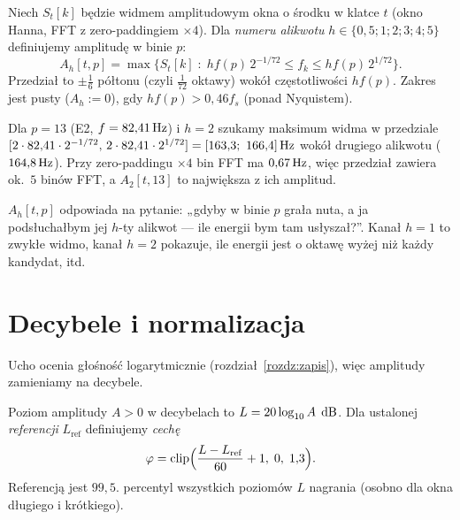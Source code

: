 \begin{definicja}\label{def:hcqt}
Niech $S_t[k]$ będzie widmem amplitudowym okna o środku w klatce $t$ (okno Hanna, FFT z zero-paddingiem $\times4$).
Dla \emph{numeru alikwotu} $h\in\{0{,}5;1;2;3;4;5\}$ definiujemy amplitudę w binie $p$:
\begin{equation}
  A_h[t,p]=\max\Big\{S_t[k]\;:\;h f(p)\,2^{-1/72}\le f_k\le h f(p)\,2^{1/72}\Big\}.
\end{equation}
Przedział to $\pm\frac1{6}$ półtonu (czyli $\frac{1}{72}$ oktawy) wokół częstotliwości $hf(p)$. Zakres jest pusty ($A_h:=0$), gdy $hf(p)>0{,}46f_s$ (ponad Nyquistem).
\end{definicja}

\begin{przyklad}\label{prz:hcqt-przedzial}
Dla $p=13$ (E2, $f=82{,}41\,\mathrm{Hz}$) i $h=2$ szukamy maksimum widma w przedziale $[2\cdot82{,}41\cdot2^{-1/72},\,2\cdot82{,}41\cdot2^{1/72}]=[163{,}3;\ 166{,}4]\Hz$ wokół drugiego alikwotu ($164{,}8\,\mathrm{Hz}$).
Przy zero-paddingu $\times4$ bin FFT ma $0{,}67\,\mathrm{Hz}$, więc przedział zawiera ok.\ $5$ binów FFT, a $A_2[t,13]$ to największa z ich amplitud.
\end{przyklad}

\begin{intuicja}
$A_h[t,p]$ odpowiada na pytanie: „gdyby w binie $p$ grała nuta, a ja podsłuchałbym jej $h$-ty alikwot --- ile energii bym tam usłyszał?”.
Kanał $h=1$ to zwykłe widmo, kanał $h=2$ pokazuje, ile energii jest o oktawę wyżej niż każdy kandydat, itd.
\end{intuicja}

\section{Decybele i normalizacja}

Ucho ocenia głośność logarytmicznie (rozdział~\ref{rozdz:zapis}), więc amplitudy zamieniamy na decybele.

\begin{definicja}\label{def:db}
Poziom amplitudy $A>0$ w decybelach to $L=20\log_{10}A\;\,\mathrm{dB}$. Dla ustalonej \emph{referencji} $L_\mathrm{ref}$ definiujemy \emph{cechę}
\begin{equation}
  \varphi=\operatorname{clip}\!\Big(\frac{L-L_\mathrm{ref}}{60}+1,\;0,\;1{,}3\Big).
\end{equation}
Referencją jest $99{,}5$. percentyl wszystkich poziomów $L$ nagrania (osobno dla okna długiego i krótkiego).
\end{definicja}

